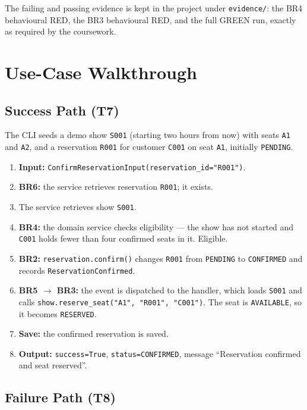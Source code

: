 \documentclass[11pt,a4paper]{article}
\newcommand{\code}[1]{\texttt{#1}}
\begin{document}
\noindent
The failing and passing evidence is kept in the project under
\code{evidence/}: the BR4 behavioural RED, the BR3 behavioural RED, and the full
GREEN run, exactly as required by the coursework.

\section{Use-Case Walkthrough}

\subsection{Success Path (T7)}

The CLI seeds a demo show \code{S001} (starting two hours from now) with seats
\code{A1} and \code{A2}, and a reservation \code{R001} for customer \code{C001}
on seat \code{A1}, initially \code{PENDING}.

\begin{enumerate}
  \item \textbf{Input:} \code{ConfirmReservationInput(reservation\_id="R001")}.
  \item \textbf{BR6:} the service retrieves reservation \code{R001}; it exists.
  \item The service retrieves show \code{S001}.
  \item \textbf{BR4:} the domain service checks eligibility --- the show has not
        started and \code{C001} holds fewer than four confirmed seats in it.
        Eligible.
  \item \textbf{BR2:} \code{reservation.confirm()} changes \code{R001} from
        \code{PENDING} to \code{CONFIRMED} and records \code{ReservationConfirmed}.
  \item \textbf{BR5 $\rightarrow$ BR3:} the event is dispatched to the handler,
        which loads \code{S001} and calls
        \code{show.reserve\_seat("A1", "R001", "C001")}. The seat is
        \code{AVAILABLE}, so it becomes \code{RESERVED}.
  \item \textbf{Save:} the confirmed reservation is saved.
  \item \textbf{Output:} \code{success=True}, \code{status=CONFIRMED},
        message ``Reservation confirmed and seat reserved''.
\end{enumerate}

\subsection{Failure Path (T8)}
\end{document}
